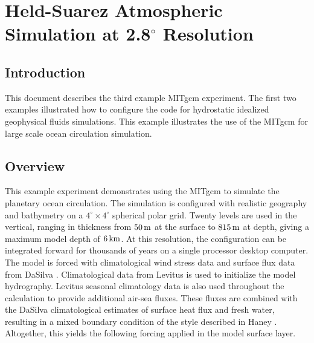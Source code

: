 
\section{Held-Suarez Atmospheric Simulation at 2.8$^\circ$ Resolution}
\label{sect:eg-hs}


%
%

\subsection{Introduction}

This document describes the third example MITgcm experiment. The first
two examples illustrated how to configure the code for hydrostatic idealized
geophysical fluids simulations. This example illustrates the use of
the MITgcm for large scale ocean circulation simulation.

\subsection{Overview}

This example experiment demonstrates using the MITgcm to simulate
the planetary ocean circulation. The simulation is configured
with realistic geography and bathymetry on a
$4^{\circ} \times 4^{\circ}$ spherical polar grid.
Twenty levels are used in the vertical, ranging in thickness
from $50\,{\rm m}$ at the surface to $815\,{\rm m}$ at depth,
giving a maximum model depth of $6\,{\rm km}$.
At this resolution, the configuration
can be integrated forward for thousands of years on a single 
processor desktop computer.
\\

The model is forced with climatological wind stress data and surface
flux data from DaSilva \cite{DaSilva94}. Climatological data
from Levitus \cite{Levitus94} is used to initialize the model hydrography.
Levitus seasonal climatology data is also used throughout the calculation
to provide additional air-sea fluxes.
These fluxes are combined with the DaSilva climatological estimates of
surface heat flux and fresh water, resulting in a mixed boundary
condition of the style described in Haney \cite{Haney}.
Altogether, this yields the following forcing applied
in the model surface layer.

